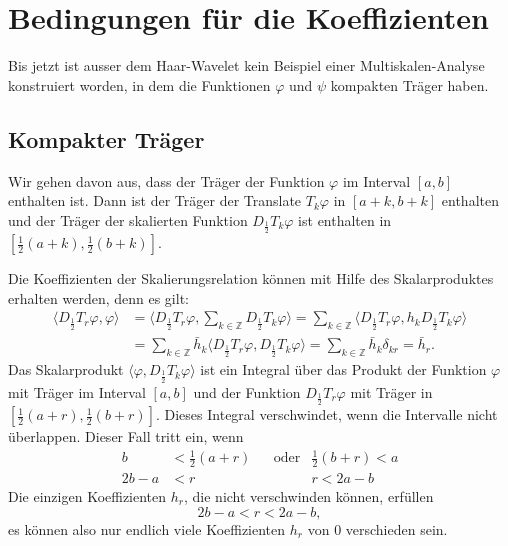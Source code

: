 %
%
%
\section{Bedingungen für die Koeffizienten\label{section:bedingungen}}
Bis jetzt ist ausser dem Haar-Wavelet kein Beispiel einer
Multiskalen-Analyse konstruiert worden, in dem die Funktionen 
$\varphi$ und $\psi$ kompakten Träger haben.

\subsection{Kompakter Träger}
Wir gehen davon aus, dass der Träger der Funktion $\varphi$ im Interval
$[a,b]$ enthalten ist.
Dann ist der Träger der Translate $T_k\varphi$ in $[a+k,b+k]$ enthalten
und der Träger der skalierten Funktion $D_{\frac12}T_k\varphi$ ist
enthalten in $[\frac12(a+k),\frac12(b+k)]$.

Die Koeffizienten der Skalierungsrelation können mit Hilfe des
Skalarproduktes erhalten werden, denn es gilt:
\begin{align*}
\langle D_{\frac12}T_r\varphi, \varphi\rangle
&=
\biggl\langle
D_{\frac12}T_r\varphi, \sum_{k\in\mathbb Z} D_{\frac12}T_k\varphi
\biggr\rangle
=
\sum_{k\in\mathbb Z}
\langle
D_{\frac12}T_r\varphi,
h_kD_{\frac12}T_k\varphi
\rangle
\\
&=
\sum_{k\in\mathbb Z}
\bar{h}_k
\langle
D_{\frac12}T_r\varphi,
D_{\frac12}T_k\varphi
\rangle
=
\sum_{k\in\mathbb Z}
\bar{h}_k
\delta_{kr}
=
\bar{h}_r.
\end{align*}
Das Skalarprodukt
$\langle \varphi, D_{\frac12}T_k\varphi\rangle$
ist ein Integral über das Produkt der Funktion $\varphi$ mit Träger im Interval
$[a,b]$ und der Funktion $D_{\frac12}T_r\varphi$  mit Träger in
$[\frac12(a+r),\frac12(b+r)]$.
Dieses Integral verschwindet, wenn die Intervalle nicht überlappen.
Dieser Fall tritt ein, wenn
\[
\begin{aligned}
b&<\frac12(a+r) &&\text{oder}& \frac12(b+r) < a
\\
2b-a&<r         &&           & r < 2a-b
\end{aligned}
\]
Die einzigen Koeffizienten $h_r$, die nicht verschwinden können, erfüllen
\[
2b-a < r < 2a-b,
\]
es können also nur endlich viele Koeffizienten $h_r$ von $0$ verschieden
sein.

